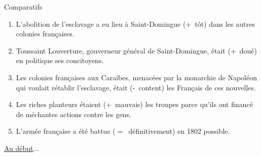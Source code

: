 \begin{frame}{Comparatifs}
  \begin{enumerate}
    \item L'abolition de l'esclavage a eu lieu à Saint-Domingue \underline{} (+~tôt) dans les autres colonies françaises.
    \item Toussaint Louverture, gouverneur général de Saint-Domingue, était \underline{} (+~doué) en politique \underline{} ses concitoyens.
    \item Les colonies françaises aux Caraïbes, menacées par la monarchie de Napoléon qui voulait rétablir l'esclavage, était \underline{} (-~content) les Français de ces nouvelles.
    \item Les riches planteurs étaient \underline{} (+~mauvais) les troupes parce qu'ils ont financé de méchantes actions contre les gens.
    \item L'armée française a été battue \underline{} ($=$~définitivement) en 1802 \underline{} possible.
  \end{enumerate}
  \raggedleft
  \hyperlink{début}{Au début}...
\end{frame}